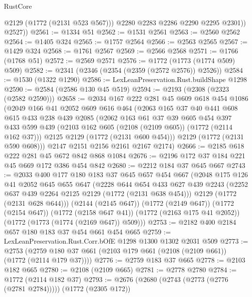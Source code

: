 \begin{lexlean}{RustCore}
\begin{coremodule}
              @2129
              (@1772 (@2131 @523 @567)))
            @2280
            @2283
            @2286
            @2290
            @2295
            @2301))
        @2527))
@2561 := @1334 @51
@2562 := @1531 @2561
@2563 := @2560 @2562
@2564 := @1405 @324
@2565 := @1757 @2564
@2566 := @2563 @2565
@2567 := @1429 @324
@2568 := @1761 @2567
@2569 := @2566 @2568
@2571 := @1766 (@1768 @51)
@2572 := @2569 @2571
@2576 := @1772 (@1773 (@1774 @509) @509)
@2582 := @2341 (@2346 (@2354 (@2359 (@2572 @2576)) @2526))
@2584 := @1530 (@1322 @1290)
@2586 := LexLeanPreservation.Rust.buildShape @1298
@2590 := @2584 (@2586 @130 @45 @519)
@2594 := @2193 (@2308 (@2323 (@2582 @2590)))
@2658 := @2034
    @167
    @222
    @281
    @45
    @609
    @618
    @454
    @1086
    (@2049
      @166
      @41
      @2052
      @609
      @616
      @464
      (@2063
        @165
        @37
        @40
        @441
        @608
        @615
        @433
        @238
        @439
        @2085
        (@2062
          @163
          @61
          @37
          @39
          @605
          @454
          @397
          @433
          @599
          @439
          (@2103 @162 @605 (@2108 (@2109 @605)) (@1772 (@2114 @162 @37)))
          @2125
          @2129
          (@1772 (@2131 @600 @454)))
        @2129
        (@1772 (@2131 @590 @608)))
      @2147
      @2151
      @2156
      @2161
      @2167
      @2174)
@2666 := @2185 @618 @222 @281 @45 @672 @842 @868 @1084
@2676 := @2196 @172 @37 @184 @221 @45 @669 @172 @386 @454 @842
@2680 := @2212 @184 @37 @645 @667
@2743 := @2033
    @400
    @177
    @180
    @183
    @37
    @645
    @657
    @454
    @667
    (@2048
      @175
      @126
      @41
      @2052
      @645
      @655
      @647
      (@2228
        @644
        @654
        @433
        @627
        @439
        @2243
        (@2252 @637 @439 @2264 @2125 @2129 (@1772 (@2131 @638 @454)))
        @2129
        (@1772 (@2131 @628 @644)))
      (@2144 (@2145 @647))
      (@1772 (@2149 @647))
      (@1772 (@2154 @647))
      (@1772 (@2158 @647 @41))
      (@1772 (@2163 @175 @41 @2052))
      (@1772 (@1773 (@1774 (@2169 @647)) @509)))
@2753 := @2182 @400 @2184 @657 @180 @183 @37 @454 @661 @454 @665
@2759 := LexLeanPreservation.Rust.Corr.bOfE @1298 @1300 @1302 @2031 @509
@2773 := @2753 (@2759 @180 @37 @661 (@2103 @179 @661 (@2108 (@2109 @661)) (@1772 (@2114 @179 @37))))
@2776 := @2759 @183 @37 @665
@2778 := @2103 @182 @665
@2780 := @2108 (@2109 @665)
@2781 := @2778 @2780
@2784 := @1772 (@2114 @182 @37)
@2793 := @2676 (@2680 (@2743 (@2773 (@2776 (@2781 @2784))))) (@1772 (@2305 @172))

\end{coremodule}
\end{lexlean}
